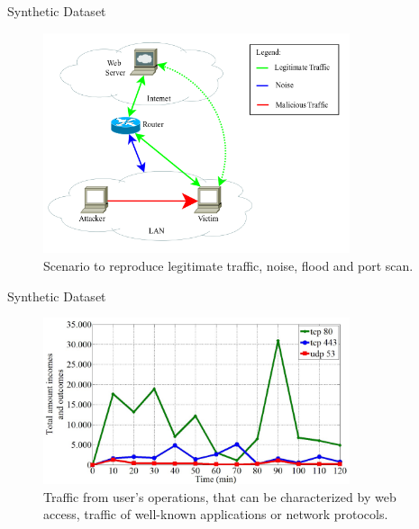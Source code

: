 \documentclass[newPxFont, numfooter, sectionpages]{beamer}
\begin{document}
\begin{frame}[c]{Synthetic Dataset}
	
	\begin{figure}[h!]
	     \centering
	     \includegraphics[width=9cm]{../figures/fig09.png}
	     \caption{Scenario to reproduce legitimate traffic, noise, flood and port scan.}
	     \label{fig:2_fig1}
	\end{figure}

\end{frame}
\begin{frame}[c]{Synthetic Dataset}
	
	\begin{figure}[h!]
	     \centering 
	     \includegraphics[width=9cm]{../figures/fig03.png}
	     \caption{Traffic from user's operations, that can be characterized by web access, traffic of well-known applications or network protocols.}
	     \label{fig:2_fig3}
	\end{figure}

\end{frame}
	
\end{document}
